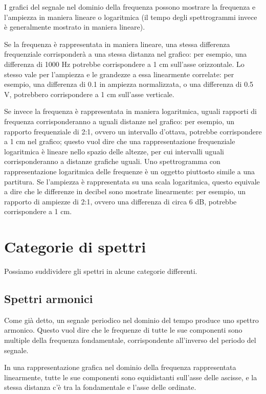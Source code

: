 I grafici del segnale nel dominio della frequenza possono mostrare la frequenza e l'ampiezza in maniera lineare o logaritmica (il tempo degli spettrogrammi invece è generalmente mostrato in maniera lineare).

Se la frequenza è rappresentata in maniera lineare, una stessa differenza frequenziale corrisponderà a una stessa distanza nel grafico: per esempio, una differenza di 1000 Hz potrebbe corrispondere a 1 cm sull'asse orizzontale. Lo stesso vale per l'ampiezza e le grandezze a essa linearmente correlate: per esempio, una differenza di 0.1 in ampiezza normalizzata, o una differenza di 0.5 V, potrebbero corrispondere a 1 cm sull'asse verticale. 

Se invece la frequenza è rappresentata in maniera logaritmica, uguali rapporti di frequenza corrisponderanno a uguali distanze nel grafico: per esempio, un rapporto frequenziale di 2:1, ovvero un intervallo d'ottava, potrebbe corrispondere a 1 cm nel grafico; questo vuol dire che una rappresentazione frequenziale logaritmica è lineare nello spazio delle altezze, per cui intervalli uguali corrisponderanno a distanze grafiche uguali. Uno spettrogramma con rappresentazione logaritmica delle frequenze è un oggetto piuttosto simile a una partitura. Se l'ampiezza è rappresentata su una scala logaritmica, questo equivale a dire che le differenze in decibel sono mostrate linearmente: per esempio, un rapporto di ampiezze di 2:1, ovvero una differenza di circa 6 dB, potrebbe corrispondere a 1 cm. 





\section{Categorie di spettri}

Possiamo suddividere gli spettri in alcune categorie differenti. 


\subsection{Spettri armonici}

Come già detto, un segnale periodico nel dominio del tempo produce uno spettro armonico. Questo vuol dire che le frequenze di tutte le sue componenti sono multiple della frequenza fondamentale, corrispondente all'inverso del periodo del segnale.

In una rappresentazione grafica nel dominio della frequenza rappresentata linearmente, tutte le sue componenti sono equidistanti sull'asse delle ascisse, e la stessa distanza c'è tra la fondamentale e l'asse delle ordinate.

